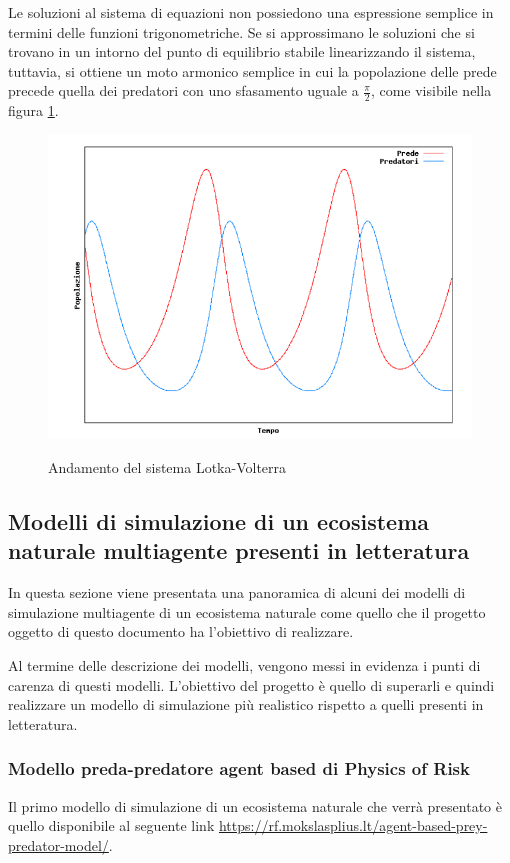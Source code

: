 \documentclass[11pt]{article}
\begin{document}
Le soluzioni al sistema di equazioni non possiedono una espressione semplice in termini delle funzioni trigonometriche. Se si approssimano le soluzioni che si trovano in un intorno del punto di equilibrio stabile linearizzando il sistema, tuttavia, si ottiene un moto armonico semplice in cui la popolazione delle prede precede quella dei predatori con uno sfasamento uguale a $\frac{\pi}{2}$, come visibile nella figura \ref{fig:AndamentoLotkaVolterra}\cite{WikiLotkaVolterra}.

\begin{figure}[h]
    \centering
    \includegraphics[scale = 0.7]{risultatoLotkaVolterra.PNG}
    \label{fig:AndamentoLotkaVolterra}
    \caption{Andamento del sistema Lotka-Volterra}
\end{figure}



\subsection{Modelli di simulazione di un ecosistema naturale multiagente presenti in letteratura}
In questa sezione viene presentata una panoramica di alcuni dei modelli di simulazione multiagente di un ecosistema naturale come quello che il progetto oggetto di questo documento ha l'obiettivo di realizzare. 

Al termine delle descrizione dei modelli, vengono messi in evidenza i punti di carenza di questi modelli. L'obiettivo del progetto è quello di superarli e quindi realizzare un modello di simulazione più realistico rispetto a quelli presenti in letteratura.

\subsubsection{Modello preda-predatore agent based di Physics of Risk}
Il primo modello di simulazione di un ecosistema naturale che verrà presentato è quello disponibile al seguente link \url{https://rf.mokslasplius.lt/agent-based-prey-predator-model/}.
\end{document}
